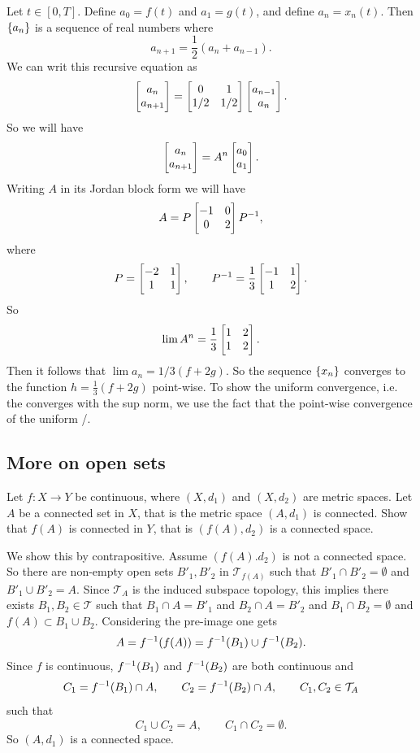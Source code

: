 \begin{solution}
	Let $ t \in [0,T] $. Define $ a_0 = f(t) $ and $ a_1 = g(t) $, and define $ a_n = x_n(t) $. Then $ \{a_n\} $ is a sequence of real numbers where
	\[ a_{n+1} = \frac{1}{2}(a_n + a_{n-1}). \]
	We can writ this recursive equation as
	\[ \begin{bmatrix} a_{n} \\ a_{n+1} \end{bmatrix} = \begin{bmatrix} 0 & 1 \\ 1/2 & 1/2 \end{bmatrix}\begin{bmatrix} a_{n-1} \\ a_n \end{bmatrix}. \]
	So we will have
	\[ \begin{bmatrix} a_n \\ a_{n+1} \end{bmatrix} = A^n\begin{bmatrix} a_0 \\ a_1 \end{bmatrix}. \]
	Writing $ A $ in its Jordan block form we will have
	\[ A = P \begin{bmatrix} -1 & 0 \\ 0 & 2 \end{bmatrix} P^{-1}, \]
	where 
	\[ P = \begin{bmatrix} -2 & 1 \\ 1 & 1 \end{bmatrix}, \qquad P^{-1} = \frac{1}{3}\begin{bmatrix} -1 & 1 \\ 1 & 2 \end{bmatrix}. \]
	So 
	\[ \lim A^n = \frac{1}{3}\begin{bmatrix} 1 & 2 \\ 1 & 2 \end{bmatrix}. \]
	Then it follows that $ \lim a_n = 1/3(f+2g). $ So the sequence $ \{x_n\} $ converges to the function $ h = \frac{1}{3}(f+2g) $ point-wise. To show the uniform convergence, i.e. the converges with the sup norm, we use the fact that the point-wise convergence of the uniform /.
\end{solution}

\subsection{More on open sets}
\begin{problem}
	Let $ f:X\to Y $ be continuous, where $ (X,d_1) $ and $ (X,d_2) $ are metric spaces. Let $ A $ be a connected set in $ X $, that is the metric space $ (A,d_1) $ is connected. Show that $ f(A) $ is connected in $ Y $, that is $ (f(A),d_2) $ is a connected space.
\end{problem}
\begin{solution}
	We show this by contrapositive. Assume $ (f(A).d_2) $ is not a connected space. So there are non-empty open sets $ B'_1,B'_2 $ in $ \mathcal{T}_{f(A)} $ such that $ B'_1\cap B'_2 = \emptyset $ and $ B'_1\cup B'_2 = A $. Since $ \mathcal{T}_A $ is the induced subspace topology, this implies there exists $ B_1,B_2 \in \mathcal{T} $ such that $ B_1\cap A = B'_1 $ and $ B_2\cap A = B'_2 $ and $ B_1\cap B_2 = \emptyset $ and $ f(A) \subset B_1\cup B_2 $. Considering the pre-image one gets
	\[ A = f^{-1}(f(A)) = f^{-1}(B_1)\cup f^{-1}(B_2). \]
	Since $ f $ is continuous, $ f^{-1}(B_1) $ and $ f^{-1}(B_2) $ are both continuous and \[  C_1 = f^{-1}(B_1)\cap A,\qquad  C_2 = f^{-1}(B_2)\cap A ,\qquad C_1,C_2 \in \mathcal{T}_A \]
	such that
	\[  C_1\cup C_2 = A, \qquad C_1\cap C_2 = \emptyset. \]
	So $ (A,d_1) $ is a connected space.
\end{solution}


